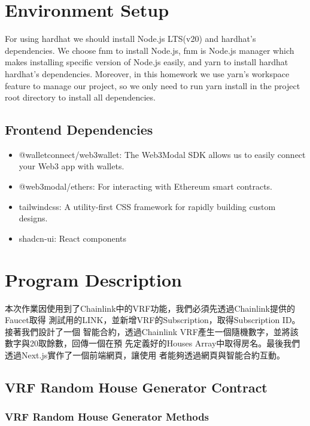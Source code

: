 \section{Environment Setup}

For using hardhat we should install Node.js LTS(v20)\cite{nodejs} and hardhat's
dependencies. We choose fnm\cite{fnm} to install Node.js, fnm is Node.js
manager which makes installing specific version of Node.js easily, and
yarn\cite{yarn} to install hardhat hardhat's dependencies. Moreover, in this
homework we use yarn's workspace feature to manage our project, so we only need
to run yarn install in the project root directory to install all dependencies.

\subsection{Frontend Dependencies}

\begin{itemize}
  \item @walletconnect/web3wallet: The Web3Modal SDK allows us to easily
  connect your Web3 app with wallets.
  \item @web3modal/ethers: For interacting with Ethereum smart contracts.
  \item tailwindcss: A utility-first CSS framework for rapidly building custom
  designs.
  \item shadcn-ui: React components
\end{itemize}

\section{Program Description}

本次作業因使用到了Chainlink中的VRF功能，我們必須先透過Chainlink提供的Faucet取得
測試用的LINK，並新增VRF的Subscription，取得Subscription ID。接著我們設計了一個
智能合約，透過Chainlink VRF產生一個隨機數字，並將該數字與20取餘數，回傳一個在預
先定義好的Houses Array中取得房名。最後我們透過Next.js實作了一個前端網頁，讓使用
者能夠透過網頁與智能合約互動。

\subsection{VRF Random House Generator Contract}

\subsubsection{VRF Random House Generator Methods}

